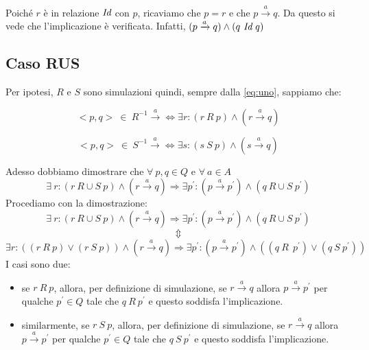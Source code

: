 		Poiché $r$ è in relazione $\emph{Id}$ con $p$, ricaviamo che $p = r$ e che $p \xrightarrow{a} q$. Da questo si vede che l'implicazione è verificata. Infatti, $(p \xrightarrow{a} q) \land (q \ \emph{Id} \ q)$
		
		\newpage
		
		\subsection{Caso RUS}
		
		Per ipotesi, $R$ e $S$ sono simulazioni quindi, sempre dalla \eqref{eq:uno}, sappiamo che:
		\vspace{-10 mm}
		\begin{center}
			\begin{equation}
			\label{tre}
			<p,q>\ \in \ R^{-1} \xrightarrow{a}  \Leftrightarrow \exists r: (r \ R \ p) \land (r \xrightarrow{a} q)
			\end{equation}
		\end{center}
		\vspace{-10 mm}
		\begin{center}
			\begin{equation}
			\label{quattro}
			<p,q>\ \in \ S^{-1} \xrightarrow{a}  \Leftrightarrow \exists s: (s \ S \ p) \land (s \xrightarrow{a} q)
			\end{equation}
		\end{center}
		Adesso dobbiamo dimostrare che $\forall \ p,q \in Q$ e $\forall \ a \in A$ $$\exists \ r: (r \ R\cup S \ p) \land (r \xrightarrow{a} q) \Rightarrow \exists p^{'}: (p \xrightarrow{a} p^{'})\land (q \ R\cup S \ p^{'})$$
		Procediamo con la dimostrazione: 
		$$\exists \ r: (r \ R\cup S \ p) \land (r \xrightarrow{a} q) \Rightarrow \exists p^{'}: (p \xrightarrow{a} p^{'})\land (q \ R\cup S \ p^{'})$$
		\vspace{-8 mm}
		$$\Updownarrow$$
		$$\exists r: ((r \ R\ p) \lor (r \ S\ p)) \land (r \xrightarrow{a} q) \Rightarrow \exists p^{'}: (p \xrightarrow{a} p^{'})\land ((q \ R\ \ p^{'})\lor(q \ S \ p^{'}))$$
		I casi sono due:
		\begin{itemize}
			\item se $r \ R\ p$, allora, per definizione di simulazione, se $r \xrightarrow{a} q$ allora $p\xrightarrow{a} p^{'}$ per qualche $p^{'}\in Q$ tale che $q \ R \ p^{'}$ e questo soddisfa l'implicazione.
			\item similarmente, se $r \ S\ p$, allora, per definizione di simulazione, se $r \xrightarrow{a} q$ allora $p\xrightarrow{a} p^{'}$ per qualche $p^{'}\in Q$ tale che $q \ S \ p^{'}$ e questo soddisfa l'implicazione.
		\end{itemize}
		
